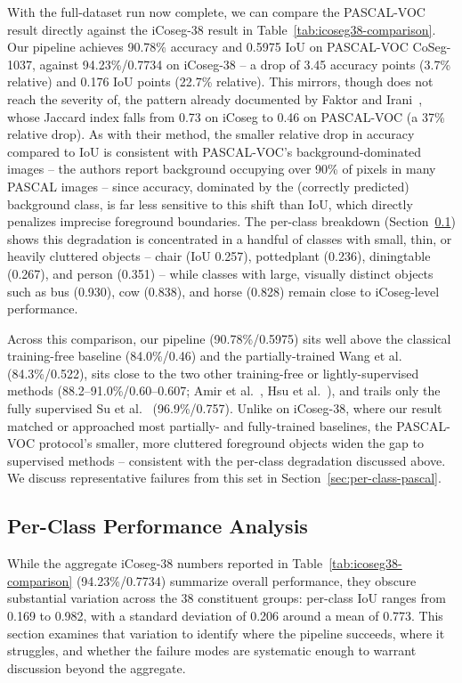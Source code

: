 With the full-dataset run now complete, we can compare the PASCAL-VOC result directly against the iCoseg-38 result in Table~\ref{tab:icoseg38-comparison}. Our pipeline achieves 90.78\% accuracy and 0.5975 IoU on PASCAL-VOC CoSeg-1037, against 94.23\%/0.7734 on iCoseg-38 -- a drop of 3.45 accuracy points (3.7\% relative) and 0.176 IoU points (22.7\% relative). This mirrors, though does not reach the severity of, the pattern already documented by Faktor and Irani~\cite{faktor2013}, whose Jaccard index falls from 0.73 on iCoseg to 0.46 on PASCAL-VOC (a 37\% relative drop). As with their method, the smaller relative drop in accuracy compared to IoU is consistent with PASCAL-VOC's background-dominated images -- the authors report background occupying over 90\% of pixels in many PASCAL images -- since accuracy, dominated by the (correctly predicted) background class, is far less sensitive to this shift than IoU, which directly penalizes imprecise foreground boundaries. The per-class breakdown (Section~\ref{sec:per-class}) shows this degradation is concentrated in a handful of classes with small, thin, or heavily cluttered objects -- chair (IoU 0.257), pottedplant (0.236), diningtable (0.267), and person (0.351) -- while classes with large, visually distinct objects such as bus (0.930), cow (0.838), and horse (0.828) remain close to iCoseg-level performance.

Across this comparison, our pipeline (90.78\%/0.5975) sits well above the classical training-free baseline (84.0\%/0.46) and the partially-trained Wang et al.~\cite{wang2017nparitite} (84.3\%/0.522), sits close to the two other training-free or lightly-supervised methods (88.2--91.0\%/0.60--0.607; Amir et al.~\cite{amir2022deepvit}, Hsu et al.~\cite{hsu2018}), and trails only the fully supervised Su et al.~\cite{su2024ufgs} (96.9\%/0.757). Unlike on iCoseg-38, where our result matched or approached most partially- and fully-trained baselines, the PASCAL-VOC protocol's smaller, more cluttered foreground objects widen the gap to supervised methods -- consistent with the per-class degradation discussed above. We discuss representative failures from this set in Section~\ref{sec:per-class-pascal}.

\subsection{Per-Class Performance Analysis}
\label{sec:per-class}

While the aggregate iCoseg-38 numbers reported in Table~\ref{tab:icoseg38-comparison} (94.23\%/0.7734) summarize overall performance, they obscure substantial variation across the 38 constituent groups: per-class IoU ranges from 0.169 to 0.982, with a standard deviation of 0.206 around a mean of 0.773. This section examines that variation to identify where the pipeline succeeds, where it struggles, and whether the failure modes are systematic enough to warrant discussion beyond the aggregate.

